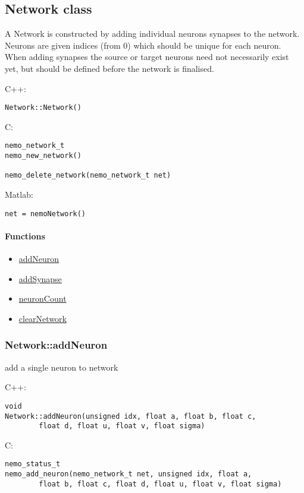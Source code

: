\subsection{Network class}
\label{Network}
A Network is constructed by adding individual neurons synapses to the network. Neurons are given indices (from 0) which should be unique for each neuron. When adding synapses the source or target neurons need not necessarily exist yet, but should be defined before the network is finalised.

\noindent C++:
\begin{lstlisting}[aboveskip=2pt]
Network::Network()
\end{lstlisting}

\noindent C:
\begin{lstlisting}[aboveskip=2pt]
nemo_network_t
nemo_new_network()
 
nemo_delete_network(nemo_network_t net)
\end{lstlisting}

\noindent Matlab:
\begin{lstlisting}[aboveskip=2pt]
net = nemoNetwork()
\end{lstlisting}
\paragraph{Functions}
\begin{itemize}
\item \hyperref[fn: addNeuron]{addNeuron}
\item \hyperref[fn: addSynapse]{addSynapse}
\item \hyperref[fn: neuronCount]{neuronCount}
\item \hyperref[fn: clearNetwork]{clearNetwork}
\end{itemize}
\clearpage
\subsubsection*{Network::addNeuron}
\label{fn: addNeuron}
add a single neuron to network


\noindent C++:
\begin{lstlisting}[aboveskip=2pt]
void
Network::addNeuron(unsigned idx, float a, float b, float c, 
        float d, float u, float v, float sigma)
\end{lstlisting}

\noindent C:
\begin{lstlisting}[aboveskip=2pt]
nemo_status_t
nemo_add_neuron(nemo_network_t net, unsigned idx, float a, 
        float b, float c, float d, float u, float v, float sigma)
\end{lstlisting}

